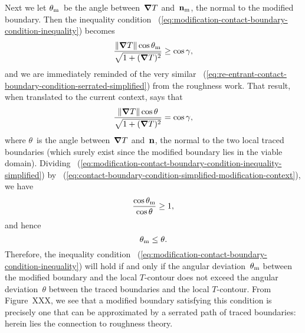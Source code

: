 Next we let $\theta_{\mathrm{m}}$~be the angle between~$\mathop{}\!\boldsymbol{\mathbf{\nabla}} T$
and~$\mathop{}\!\boldsymbol{\mathbf{n}}_{\mathrm{m}}$, the normal to the modified boundary.
Then the inequality condition~%
  (\ref{eq:modification-contact-boundary-condition-inequality})
becomes
\begin{equation}
  \frac{\lVert\mathop{}\!\boldsymbol{\mathbf{\nabla}} T\rVert \cos\theta_{\mathrm{m}}}{\sqrt{1 + (\mathop{}\!\boldsymbol{\mathbf{\nabla}} T)^2}} \ge \cos\gamma,
  \label{eq:modification-contact-boundary-condition-inequality-simplified}
\end{equation}
and we are immediately reminded of the very similar~%
  (\ref{eq:re-entrant-contact-boundary-condition-serrated-simplified})
from the roughness work.
That result, when translated to the current context,
says that
\begin{equation}
  \frac{\lVert\mathop{}\!\boldsymbol{\mathbf{\nabla}} T\rVert \cos\theta}{\sqrt{1 + (\mathop{}\!\boldsymbol{\mathbf{\nabla}} T)^2}} = \cos\gamma,
  \label{eq:contact-boundary-condition-simplified-modification-context}
\end{equation}
where $\theta$~is the angle between~$\mathop{}\!\boldsymbol{\mathbf{\nabla}} T$ and~$\mathop{}\!\boldsymbol{\mathbf{n}}$,
the normal to the two local traced boundaries
(which surely exist since the modified boundary lies in the viable domain).
Dividing~%
  (\ref{eq:modification-contact-boundary-condition-inequality-simplified})
by~%
  (\ref{eq:contact-boundary-condition-simplified-modification-context}),
we have
\begin{equation}
  \frac{\cos\theta_{\mathrm{m}}}{\cos\theta} \ge 1,
  \label{eq:modification-cosine-ratio-inequality}
\end{equation}
and hence
\begin{equation}
  \theta_{\mathrm{m}} \le \theta.
  \label{eq:modification-deviation-bound}
\end{equation}
Therefore, the inequality condition~%
  (\ref{eq:modification-contact-boundary-condition-inequality})
will hold if and only if
the angular deviation~$\theta_{\mathrm{m}}$
between the modified boundary and the local $T$-contour
does not exceed the angular deviation~$\theta$
between the traced boundaries and the local $T$-contour.
From Figure~XXX\@, %
we see that a modified boundary satisfying this condition
is precisely one that can be approximated
by a serrated path of traced boundaries:
herein lies the connection to roughness theory.

